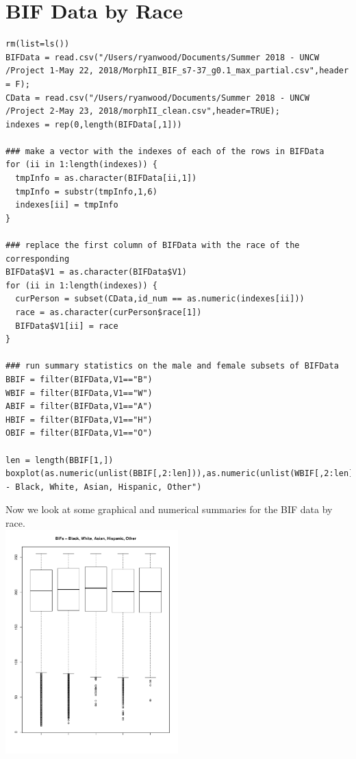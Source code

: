 \documentclass{article}
\begin{document}
\section{BIF Data by Race}
\begin{verbatim}
rm(list=ls())
BIFData = read.csv("/Users/ryanwood/Documents/Summer 2018 - UNCW /Project 1-May 22, 2018/MorphII_BIF_s7-37_g0.1_max_partial.csv",header = F);
CData = read.csv("/Users/ryanwood/Documents/Summer 2018 - UNCW /Project 2-May 23, 2018/morphII_clean.csv",header=TRUE);
indexes = rep(0,length(BIFData[,1]))

### make a vector with the indexes of each of the rows in BIFData
for (ii in 1:length(indexes)) {
  tmpInfo = as.character(BIFData[ii,1])
  tmpInfo = substr(tmpInfo,1,6)
  indexes[ii] = tmpInfo
}

### replace the first column of BIFData with the race of the corresponding
BIFData$V1 = as.character(BIFData$V1)
for (ii in 1:length(indexes)) {
  curPerson = subset(CData,id_num == as.numeric(indexes[ii]))
  race = as.character(curPerson$race[1])
  BIFData$V1[ii] = race
}

### run summary statistics on the male and female subsets of BIFData
BBIF = filter(BIFData,V1=="B")
WBIF = filter(BIFData,V1=="W")
ABIF = filter(BIFData,V1=="A")
HBIF = filter(BIFData,V1=="H")
OBIF = filter(BIFData,V1=="O")

len = length(BBIF[1,])
boxplot(as.numeric(unlist(BBIF[,2:len])),as.numeric(unlist(WBIF[,2:len])),as.numeric(unlist(ABIF[,2:len])),as.numeric(unlist(HBIF[,2:len])),as.numeric(unlist(OBIF[,2:len])),main="BIFs - Black, White, Asian, Hispanic, Other")
\end{verbatim}

Now we look at some graphical and numerical summaries for the BIF data by race.\\

\includegraphics[width=0.5\textwidth]{PART4.pdf}
\end{document}
